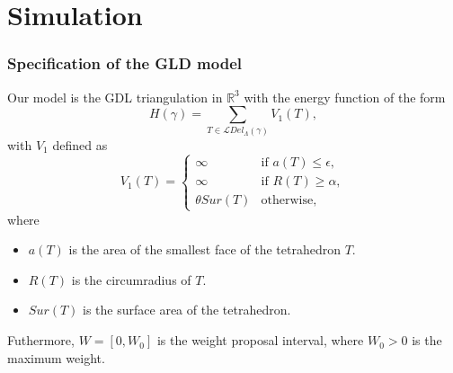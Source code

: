 \documentclass[c, 10pt]{beamer}
\begin{document}
\section{Simulation}
\framesection{}




\begin{frame}\frametitle{Specification of the GLD model}
Our model is the GDL triangulation in $\mathbb R^3$ with  the energy function of the form
$$H(\gamma)= \sum_{T \in \mathcal LDel_\Lambda(\gamma)} V_1(T),$$ 
with $V_1$ defined as
\begin{equation}
V_1(T) = 
\left\{
    \begin{array}{ll}
        \infty & \mbox{if } a(T)\leq \epsilon, \\
        \infty & \mbox{if } R(T)\geq \alpha, \\
        \theta Sur(T) & \mbox{otherwise, }
    \end{array}
\right. 
\end{equation}
where
\begin{itemize}
\item $a(T)$ is the area of the smallest face of the tetrahedron $T$.
\item $R(T)$ is the circumradius of $T$.
\item $Sur(T)$ is the surface area of the tetrahedron.
\end{itemize}

Futhermore, $W = [0,W_0]$ is the weight proposal interval, where $W_0>0$ is the maximum weight.

\end{frame}
\end{document}
